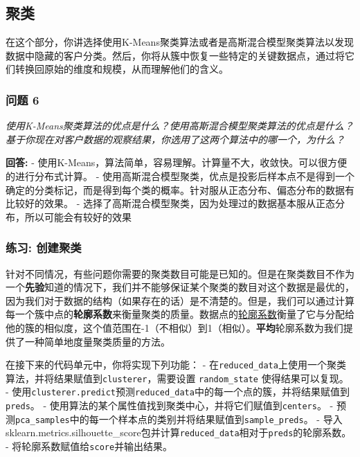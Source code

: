 \documentclass[11pt]{article}
\begin{document}
    \subsection{聚类}\label{ux805aux7c7b}

在这个部分，你讲选择使用K-Means聚类算法或者是高斯混合模型聚类算法以发现数据中隐藏的客户分类。然后，你将从簇中恢复一些特定的关键数据点，通过将它们转换回原始的维度和规模，从而理解他们的含义。

    \subsubsection{问题 6}\label{ux95eeux9898-6}

\emph{使用K-Means聚类算法的优点是什么？使用高斯混合模型聚类算法的优点是什么？基于你现在对客户数据的观察结果，你选用了这两个算法中的哪一个，为什么？}

    \textbf{回答:} -
使用K-Means，算法简单，容易理解。计算量不大，收敛快。可以很方便的进行分布式计算。
-
使用高斯混合模型聚类，优点是投影后样本点不是得到一个确定的分类标记，而是得到每个类的概率。针对服从正态分布、偏态分布的数据有比较好的效果。
-
选择了高斯混合模型聚类，因为处理过的数据基本服从正态分布，所以可能会有较好的效果

    \subsubsection{练习:
创建聚类}\label{ux7ec3ux4e60-ux521bux5efaux805aux7c7b}

针对不同情况，有些问题你需要的聚类数目可能是已知的。但是在聚类数目不作为一个\textbf{先验}知道的情况下，我们并不能够保证某个聚类的数目对这个数据是最优的，因为我们对于数据的结构（如果存在的话）是不清楚的。但是，我们可以通过计算每一个簇中点的\textbf{轮廓系数}来衡量聚类的质量。数据点的\href{http://scikit-learn.org/stable/modules/generated/sklearn.metrics.silhouette_score.html}{轮廓系数}衡量了它与分配给他的簇的相似度，这个值范围在-1（不相似）到1（相似）。\textbf{平均}轮廓系数为我们提供了一种简单地度量聚类质量的方法。

在接下来的代码单元中，你将实现下列功能： -
在\texttt{reduced\_data}上使用一个聚类算法，并将结果赋值到\texttt{clusterer}，需要设置
\texttt{random\_state} 使得结果可以复现。 -
使用\texttt{clusterer.predict}预测\texttt{reduced\_data}中的每一个点的簇，并将结果赋值到\texttt{preds}。
- 使用算法的某个属性值找到聚类中心，并将它们赋值到\texttt{centers}。 -
预测\texttt{pca\_samples}中的每一个样本点的类别并将结果赋值到\texttt{sample\_preds}。
-
导入sklearn.metrics.silhouette\_score包并计算\texttt{reduced\_data}相对于\texttt{preds}的轮廓系数。
- 将轮廓系数赋值给\texttt{score}并输出结果。
\end{document}
